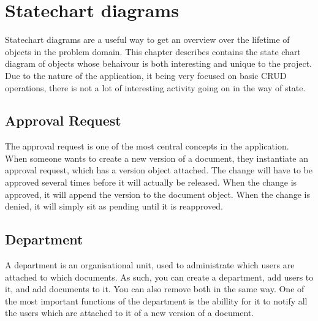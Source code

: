 \section{Statechart diagrams}
Statechart diagrams are a useful way to get an overview over the lifetime of objects in the problem domain.
This chapter describes contains the state chart diagram of objects whose behaivour is both interesting and unique to the project.
Due to the nature of the application, it being very focused on basic CRUD operations, there is not a lot of interesting activity going on in the way of state.

\subsection{Approval Request}
The approval request is one of the most central concepts in the application.
When someone wants to create a new version of a document, they instantiate an approval request, which has a version object attached.
The change will have to be approved several times before it will actually be released.
When the change is approved, it will append the version to the document object. When the change is denied, it will simply sit as pending until it is reapproved.


\subsection{Department}
A department is an organisational unit, used to administrate which users are attached to which documents.
As such, you can create a department, add users to it, and add documents to it.
You can also remove both in the same way.
One of the most important functions of the department is the abillity for it to notify all the users which are attached to it of a new version of a document.

